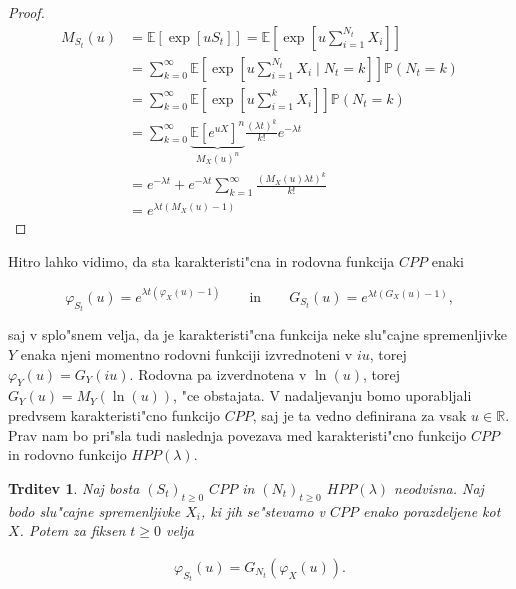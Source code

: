 \documentclass[12pt, a4paper, reqno]{amsart}
\theoremstyle{definition} %
\theoremstyle{plain} %
\newtheorem{trditev}[definicija]{Trditev}
\newcommand{\R}{\mathbb{R}}
\newcommand{\E}{\mathbb{E}}
\newcommand{\Prob}{\mathbb{P}}
\newcommand{\1}{\mathds{1}}
\begin{document}
    \begin{proof}
        \begin{align}
            M_{S_t}(u) 
                    &= \E\left[\exp\left[uS_t\right]\right] = \nonumber
                        \E\left[\exp\left[u\sum_{i = 1}^{N_t}X_i\right]\right] \nonumber\\
                    &= \sum_{k=0}^{\infty}
                        \E\left[\exp\left[u\sum_{i = 1}^{N_t}X_i\mid N_t=k\right]\right]\Prob\left(N_t = k\right) \nonumber \\ 
                    &= \sum_{k=0}^{\infty}
                        \E\left[\exp\left[u\sum_{i = 1}^kX_i\right]\right]\Prob\left(N_t = k\right) \nonumber \\
                    &= \sum_{k=0}^{\infty}
                        \underbrace{\E\left[e^{uX}\right]^n}_{M_X(u)^n}\frac{(\lambda t)^k}{k!}e^{-\lambda t} \label{eq:MomentS_t}\\ 
                    &= e^{-\lambda t} + e^{-\lambda t}\sum_{k=1}^\infty\frac{\left(M_X(u)\lambda t\right)^k}{k!} \nonumber \\
                    &= e^{\lambda t\left(M_X(u) - 1\right)} \nonumber
        \end{align}
    \end{proof}

    Hitro lahko vidimo, da sta karakteristi"cna in rodovna funkcija $CPP$ enaki

    \begin{equation*}
        \varphi_{S_t}(u) = e^{\lambda t\left(\varphi_X(u) - 1\right)} \qquad \text{in} \qquad 
        G_{S_t}(u) = e^{\lambda t\left(G_X(u) - 1\right)},
    \end{equation*} 

    \noindent
    saj v splo"snem velja, da je karakteristi"cna funkcija neke slu"cajne spremenljivke $Y$ enaka
    njeni momentno rodovni funkciji izvrednoteni v $iu$, torej $\varphi_Y(u) = G_Y(iu)$. Rodovna pa 
    izverdnotena v $\ln(u)$, torej $G_Y(u) = M_Y(\ln(u))$, "ce obstajata.
    V nadaljevanju bomo uporabljali predvsem karakteristi"cno funkcijo $CPP$, saj je ta vedno definirana 
    za vsak $u\in\R$. Prav nam bo pri"sla tudi naslednja povezava med karakteristi"cno funkcijo $CPP$ 
    in rodovno funkcijo $HPP(\lambda)$.
    \begin{trditev}
        Naj bosta $(S_t)_{t\geq0}$ $CPP$ in $(N_t)_{t\geq0}$ $HPP(\lambda)$ neodvisna. 
        Naj bodo slu"cajne spremenljivke $X_i$, ki jih se"stevamo v $CPP$ enako porazdeljene kot $X$. 
        Potem za fiksen $t\geq0$ velja

        \begin{align*}
            \varphi_{S_t}(u) = G_{N_t}\left(\varphi_{X}(u)\right).
        \end{align*}

        \label{trd:povezavaRodovneKarkateristicne}
    \end{trditev}
\end{document}
